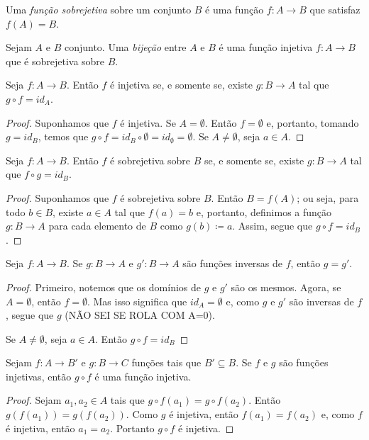 \begin{defi}
	Uma \emph{função sobrejetiva} sobre um conjunto $B$ é uma função $f: A \to B$ que satisfaz $f(A)=B$.
\end{defi}

\begin{defi}
	Sejam $A$ e $B$ conjunto. Uma \emph{bijeção} entre $A$ e $B$ é uma função injetiva $f: A \to B$ que é sobrejetiva sobre $B$.
\end{defi}

\begin{prop}
\label{prop:func.inv.esq}
	Seja $f: A \to B$. Então $f$ é injetiva se, e somente se, existe $g: B \to A$ tal que $g \circ f = id_A$.
\end{prop}
\begin{proof}
	Suponhamos que $f$ é injetiva. Se $A = \emptyset$. Então $f=\emptyset$ e, portanto, tomando $g=id_B$, temos que $g \circ f = id_B \circ \emptyset = id_\emptyset = \emptyset$.
	Se $A \neq \emptyset$, seja $a \in A$.
	
	
\end{proof}

\begin{prop}
\label{prop:func.inv.dir}
	Seja $f: A \to B$. Então $f$ é sobrejetiva sobre $B$ se, e somente se, existe $g: B \to A$ tal que $f \circ g = id_B$.
\end{prop}
\begin{proof}
	Suponhamos que $f$ é sobrejetiva sobre $B$. Então $B=f(A)$; ou seja, para todo $b \in B$, existe $a \in A$ tal que $f(a)=b$ e, portanto, definimos a função $g: B \to A$ para cada elemento de $B$ como $g(b) \coloneqq a$. Assim, segue que $g \circ f = id_B$.
\end{proof}

\begin{prop}
	Seja $f: A \to B$. Se $g: B \to A$ e $g': B \to A$ são funções inversas de $f$, então $g=g'$.
\end{prop}
\begin{proof}
	Primeiro, notemos que os domínios de $g$ e $g'$ são os mesmos. Agora, se $A=\emptyset$, então $f=\emptyset$. Mas isso significa que $id_A = \emptyset$ e, como $g$ e $g'$ são inversas de $f$, segue que $g$ (NÃO SEI SE ROLA COM A=0).
	
	Se $A \neq \emptyset$, seja $a \in A$. Então $g \circ f = id_B$
\end{proof}

\begin{prop}
\label{prop:comp.func.inj}
	Sejam $f: A \to B'$ e $g: B \to C$ funções tais que $B' \subseteq B$. Se $f$ e $g$ são funções injetivas, então $g \circ f$ é uma função injetiva.
\end{prop}
\begin{proof}
	Sejam $a_1,a_2 \in A$ tais que $g \circ f(a_1)=g \circ f(a_2)$. Então $g(f(a_1))=g(f(a_2))$. Como $g$ é injetiva, então $f(a_1)=f(a_2)$ e, como $f$ é injetiva, então $a_1=a_2$. Portanto $g \circ f$ é injetiva.
\end{proof}

